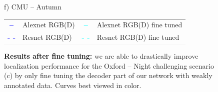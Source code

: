 \begin{figure}
\begin{minipage}{0.27\linewidth}
		f) CMU -- Autumn
	\end{minipage}
	
	\vspace{0.2cm}
		
	\begin{scriptsize}
	\begin{tabular}{c l c l}
		\textcolor{blue}{\textbf{--}} & Alexnet RGB(D) & \textcolor{cyan}{\textbf{--}} & Alexnet RGB(D) fine tuned \\
		\textcolor{blue}{\textbf{- -}} & Resnet RGB(D) & \textcolor{cyan}{\textbf{- -}} & Resnet RGB(D) fine tuned \\
	\end{tabular}		
	\end{scriptsize}
	
	\caption[Results after fine tuning]{\label{fig:ft_night} \textbf{Results after fine tuning:} we are able to drastically improve localization performance for the Oxford -- Night challenging scenario (c) by only fine tuning the decoder part of our network with weakly annotated data. Curves best viewed in color.}
\end{figure}
